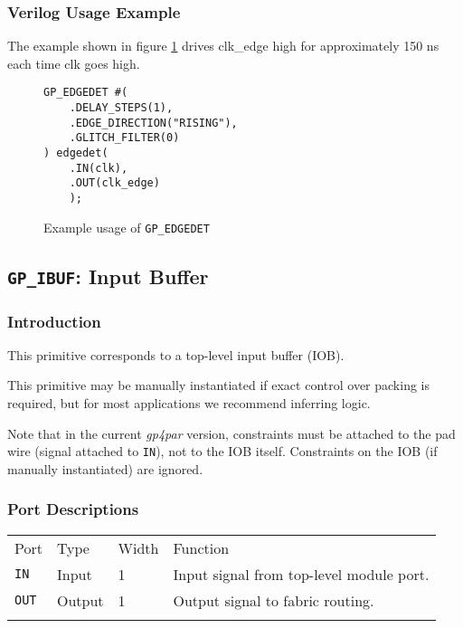 \documentclass[11pt]{article}
\newcommand{\namestyle}[1]{\textit{#1}}
\newcommand{\tokenstyle}[1]{\texttt{#1}}
\newcommand{\whenstyle}[1]{{\fontseries{sb}\selectfont#1}}
\newcommand{\thinhline}{\Xhline{1\arrayrulewidth}}
\newcommand{\thickhline}{\Xhline{2.5\arrayrulewidth}}
\begin{document}
\subsubsection{Verilog Usage Example}

The example shown in figure \ref{gp-edgedet-example} drives clk\_edge high for approximately 150 ns each time clk goes
high.

\begin{figure}[h]
\begin{lstlisting}
GP_EDGEDET #(
    .DELAY_STEPS(1),
    .EDGE_DIRECTION("RISING"),
    .GLITCH_FILTER(0)
) edgedet(
	.IN(clk),
	.OUT(clk_edge)
	);
\end{lstlisting}
\caption{Example usage of \tokenstyle{GP\_EDGEDET}}
\label{gp-edgedet-example}
\end{figure}


\pagebreak
\subsection{\tokenstyle{GP\_IBUF}: Input Buffer}
\label{gp-ibuf}

\subsubsection{Introduction}
This primitive corresponds to a top-level input buffer (IOB).

This primitive may be manually instantiated if exact control over packing is required, but for most applications we
recommend inferring logic.

Note that in the current \namestyle{gp4par} version, constraints must be attached to the pad wire (signal attached to \tokenstyle{IN}), not
to the IOB itself. Constraints on the IOB (if manually instantiated) are ignored.

\subsubsection{Port Descriptions}

\begin{tabularx}{\textwidth}{lllX}
\thinhline
\whenstyle{Port} & \whenstyle{Type} & \whenstyle{Width} & \whenstyle{Function} \\
\thickhline
\tokenstyle{IN} & Input & 1 & Input signal from top-level module port. \\
\thinhline
\tokenstyle{OUT} & Output & 1 & Output signal to fabric routing. \\
\thinhline
\end{tabularx}
\end{document}
